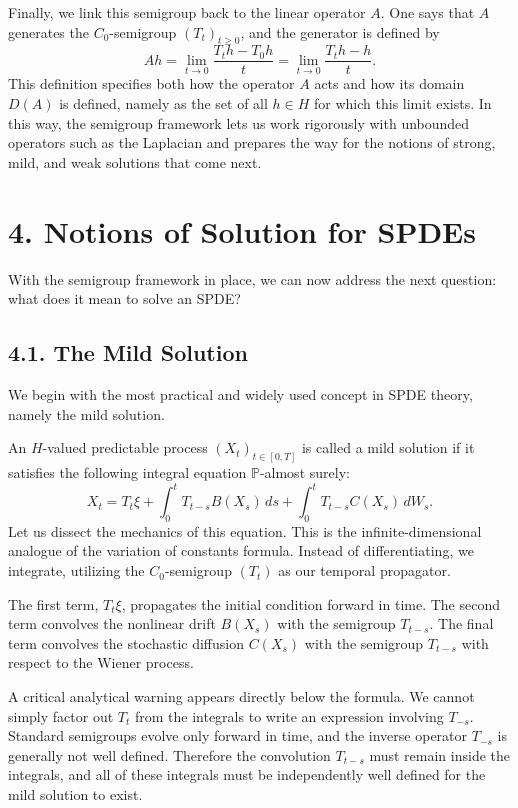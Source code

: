 \documentclass[11pt]{article}
\theoremstyle{definition}
\theoremstyle{remark}
\begin{document}
Finally, we link this semigroup back to the linear operator \(A\). One says that \(A\) generates the \(C_0\)-semigroup \((T_t)_{t\ge 0}\), and the generator is defined by
\[
Ah=\lim_{t\to 0}\frac{T_th-T_0h}{t}
=
\lim_{t\to 0}\frac{T_th-h}{t}.
\]
This definition specifies both how the operator \(A\) acts and how its domain \(D(A)\) is defined, namely as the set of all \(h\in H\) for which this limit exists. In this way, the semigroup framework lets us work rigorously with unbounded operators such as the Laplacian and prepares the way for the notions of strong, mild, and weak solutions that come next.

\section*{4. Notions of Solution for SPDEs}
With the semigroup framework in place, we can now address the next question: what does it mean to solve an SPDE?

\subsection*{4.1. The Mild Solution}
We begin with the most practical and widely used concept in SPDE theory, namely the mild solution.

An \(H\)-valued predictable process \((X_t)_{t\in[0,T]}\) is called a mild solution if it satisfies the following integral equation \(\mathbb P\)-almost surely:
\[
X_t
=
T_t\xi+\int_0^t T_{t-s}B(X_s)\,ds+\int_0^t T_{t-s}C(X_s)\,dW_s.
\]
Let us dissect the mechanics of this equation. This is the infinite-dimensional analogue of the variation of constants formula. Instead of differentiating, we integrate, utilizing the \(C_0\)-semigroup \((T_t)\) as our temporal propagator.

The first term, \(T_t\xi\), propagates the initial condition forward in time. The second term convolves the nonlinear drift \(B(X_s)\) with the semigroup \(T_{t-s}\). The final term convolves the stochastic diffusion \(C(X_s)\) with the semigroup \(T_{t-s}\) with respect to the Wiener process.

A critical analytical warning appears directly below the formula. We cannot simply factor out \(T_t\) from the integrals to write an expression involving \(T_{-s}\). Standard semigroups evolve only forward in time, and the inverse operator \(T_{-s}\) is generally not well defined. Therefore the convolution \(T_{t-s}\) must remain inside the integrals, and all of these integrals must be independently well defined for the mild solution to exist.
\end{document}
